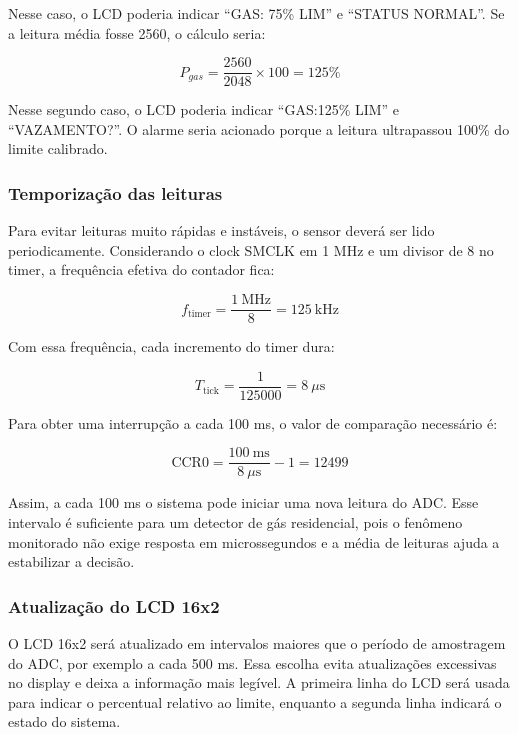 \documentclass[11pt,a4paper]{article}
\numberwithin{equation}{section}
\begin{document}
Nesse caso, o LCD poderia indicar ``GAS: 75\% LIM'' e ``STATUS NORMAL''. Se a leitura média fosse
2560, o cálculo seria:

\begin{equation}
  P_{gas} = \frac{2560}{2048} \times 100 = 125\%
  \label{eq:p125}
\end{equation}

Nesse segundo caso, o LCD poderia indicar ``GAS:125\% LIM'' e ``VAZAMENTO?''. O alarme seria acionado
porque a leitura ultrapassou 100\% do limite calibrado.

\subsubsection{Temporização das leituras}

Para evitar leituras muito rápidas e instáveis, o sensor deverá ser lido periodicamente. Considerando
o clock SMCLK em 1 MHz e um divisor de 8 no timer, a frequência efetiva do contador fica:

\begin{equation}
  f_{\text{timer}} = \frac{1\ \text{MHz}}{8} = 125\ \text{kHz}
  \label{eq:ftimer}
\end{equation}

Com essa frequência, cada incremento do timer dura:

\begin{equation}
  T_{\text{tick}} = \frac{1}{125000} = 8\ \mu\text{s}
  \label{eq:tick}
\end{equation}

Para obter uma interrupção a cada 100 ms, o valor de comparação necessário é:

\begin{equation}
  \text{CCR0} = \frac{100\ \text{ms}}{8\ \mu\text{s}} - 1 = 12499
  \label{eq:ccr0}
\end{equation}

Assim, a cada 100 ms o sistema pode iniciar uma nova leitura do ADC. Esse intervalo é suficiente para
um detector de gás residencial, pois o fenômeno monitorado não exige resposta em microssegundos e a
média de leituras ajuda a estabilizar a decisão.

\subsubsection{Atualização do LCD 16x2}

O LCD 16x2 será atualizado em intervalos maiores que o período de amostragem do ADC, por exemplo a
cada 500 ms. Essa escolha evita atualizações excessivas no display e deixa a informação mais legível.
A primeira linha do LCD será usada para indicar o percentual relativo ao limite, enquanto a segunda
linha indicará o estado do sistema.
\end{document}
